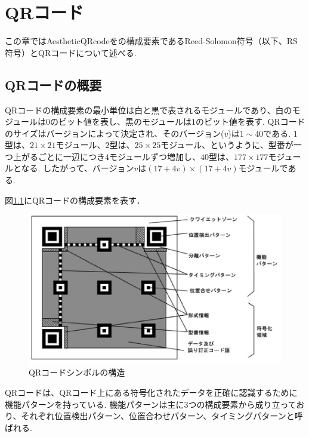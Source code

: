 \documentclass{thesis}
\begin{document}
\chapter{QRコード}
\label{chap:2}


この章ではAestheticQRcodeをの構成要素であるReed-Solomon符号（以下、RS符号）とQRコードについて述べる.


\section{QRコードの概要}

QRコードの構成要素の最小単位は白と黒で表されるモジュールであり、白のモジュールは$0$のビット値を表し、黒のモジュールは$1$のビット値を表す.
QRコードのサイズはバージョンによって決定され、そのバージョン($v$)は$1\sim40$である.
$1$型は、$21\times21$モジュール、$2$型は、$25\times25$モジュール、というように、型番が一つ上がるごとに一辺につき$4$モジュールずつ増加し、$40$型は、$177\times177$モジュールとなる.
したがって、バージョン$v$は$(17+4v)\times(17+4v)$モジュールである.

図\ref{fig:qrcode_config}にQRコードの構成要素を表す． \\

\begin{figure}[H]
\centering
\includegraphics[width=15cm,clip]{pic/qrcode_config.eps}
\caption{QRコードシンボルの構造\cite{jis}}
\label{fig:qrcode_config}
\end{figure}

QRコードは、QRコード上にある符号化されたデータを正確に認識するために機能パターンを持っている.
機能パターンは主に3つの構成要素から成り立っており、それぞれ位置検出パターン、位置合わせパターン、タイミングパターンと呼ばれる.
\end{document}
